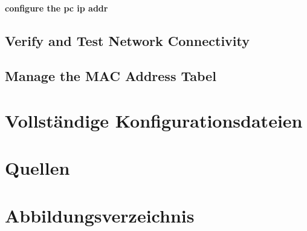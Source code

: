 \documentclass[a4paper]{article}
\begin{document}
\paragraph {configure the pc ip addr}
\subsection{Verify and Test Network Connectivity}

\subsection{Manage the MAC Address Tabel}

\newpage

\section{Vollständige Konfigurationsdateien}

\newpage

\section{Quellen}

\newpage
\section{Abbildungsverzeichnis}

\listoffigures
\end{document}
